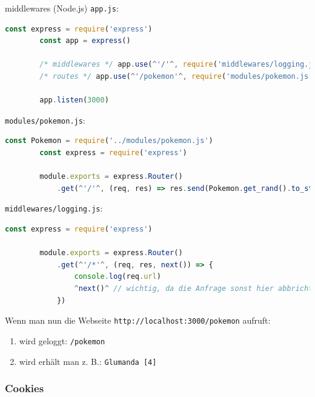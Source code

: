 \begin{example}{middlewares (Node.js)}
    \texttt{app.js}:
    \begin{lstlisting}[language=JavaScript]
        const express = require('express')
        const app = express()

        /* middlewares */ app.use(^'/'^, require('middlewares/logging.js')) // 1.
        /* routes */ app.use(^'/pokemon'^, require('modules/pokemon.js')) // 2.

        app.listen(3000)
    \end{lstlisting}

    \texttt{modules/pokemon.js}:
    \begin{lstlisting}[language=JavaScript]
        const Pokemon = require('../modules/pokemon.js')
        const express = require('express')
        
        module.exports = express.Router()
            .get(^'/'^, (req, res) => res.send(Pokemon.get_rand().to_string()) )
    \end{lstlisting}

    \texttt{middlewares/logging.js}:
    \begin{lstlisting}[language=JavaScript]
        const express = require('express')
        
        module.exports = express.Router()
            .get(^'/*'^, (req, res, next()) => {
                console.log(req.url)
                ^next()^ // wichtig, da die Anfrage sonst hier abbricht
            })
    \end{lstlisting}

    Wenn man nun die Webseite \texttt{http://localhost:3000/pokemon} aufruft:
    \begin{enumerate}
        \item wird geloggt: \texttt{/pokemon}
        \item wird erhält man z. B.: \texttt{Glumanda [4]}
    \end{enumerate}
\end{example}

\subsubsection{Cookies}

